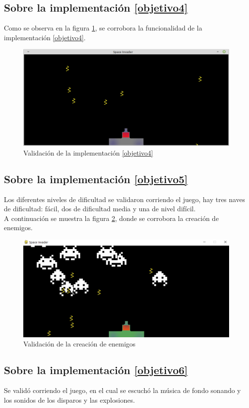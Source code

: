 \documentclass[12pt,letterpaper]{article}
\begin{document}
\subsection{Sobre la implementación \ref{objetivo4}}
Como se observa en la figura \ref{validacion04}, se corrobora la funcionalidad de la implementación \ref{objetivo4}.
\begin{figure}[H]
    \centering
    \includegraphics[width=0.7\linewidth]{jj.png}
    \caption{Validación de la implementación \ref{objetivo4}}
    \label{validacion04}
\end{figure}

\subsection{Sobre la implementación \ref{objetivo5}}
Los diferentes niveles de dificultad se validaron corriendo el juego, hay tres naves de dificultad: fácil, dos de dificultad media y una de nivel difícil. \vspace{5mm}\\
\indent A continuación se muestra la figura \ref{05}, donde se corrobora la creación de enemigos.
\begin{figure}[H]
    \centering
    \includegraphics[width=0.7\linewidth]{validacion05.png}
    \caption{Validación de la creación de enemigos}
    \label{05}
\end{figure}
\subsection{Sobre la implementación \ref{objetivo6}}
Se validó corriendo el juego, en el cual se escuchó la música de fondo sonando y los sonidos de los disparos y las explosiones.
\end{document}
